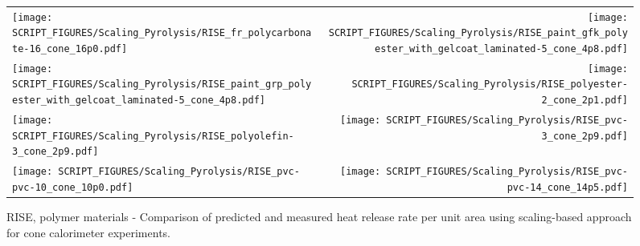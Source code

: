 \vspace{-0.4cm}
\\
\\
\\

\begin{figure}[p]
\begin{tabular*}{\textwidth}{l@{\extracolsep{\fill}}r}
\texttt{[image: SCRIPT\_FIGURES/Scaling\_Pyrolysis/RISE\_fr\_polycarbonate-16\_cone\_16p0.pdf]} &
\texttt{[image: SCRIPT\_FIGURES/Scaling\_Pyrolysis/RISE\_paint\_gfk\_polyester\_with\_gelcoat\_laminated-5\_cone\_4p8.pdf]} \\
\texttt{[image: SCRIPT\_FIGURES/Scaling\_Pyrolysis/RISE\_paint\_grp\_polyester\_with\_gelcoat\_laminated-5\_cone\_4p8.pdf]} &
\texttt{[image: SCRIPT\_FIGURES/Scaling\_Pyrolysis/RISE\_polyester-2\_cone\_2p1.pdf]} \\
\texttt{[image: SCRIPT\_FIGURES/Scaling\_Pyrolysis/RISE\_polyolefin-3\_cone\_2p9.pdf]} &
\texttt{[image: SCRIPT\_FIGURES/Scaling\_Pyrolysis/RISE\_pvc-3\_cone\_2p9.pdf]} \\
\texttt{[image: SCRIPT\_FIGURES/Scaling\_Pyrolysis/RISE\_pvc-pvc-10\_cone\_10p0.pdf]} &
\texttt{[image: SCRIPT\_FIGURES/Scaling\_Pyrolysis/RISE\_pvc-pvc-14\_cone\_14p5.pdf]} \\
\end{tabular*}
\caption[HRRPUA of RISE Materials using scaling model, polymer materials]
{RISE, polymer materials - Comparison of predicted and measured heat release rate per unit area using scaling-based approach for cone calorimeter experiments.}
\label{RISE_Materials_HRR_Polymers1}
\end{figure}

